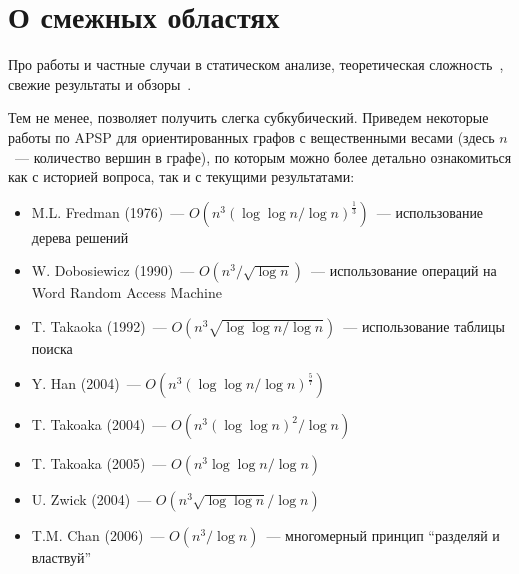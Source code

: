 \section{О смежных областях}
\label{sec:Conclusion_RelatedAreas}

Про работы и частные случаи в статическом анализе, теоретическая сложность~\cite{10.1145/3571252, istomina2023finegrained}, свежие результаты и обзоры~\cite{10.1145/3583660.3583664}.




Тем не менее, позволяет получить слегка субкубический.
 Приведем некоторые работы по APSP для ориентированных графов с вещественными весами (здесь $n$~--- количество вершин в графе), по которым можно более детально ознакомиться как с историей вопроса, так и с текущими результатами:
 \begin{itemize}
     \item M.L. Fredman (1976)~--- $O(n^3(\log \log n / \log n)^\frac{1}{3})$~--- использование дерева решений~
     \item W. Dobosiewicz (1990)~--- $O(n^3 / \sqrt{\log n})$~--- использование операций на Word Random Access Machine~
     \item T. Takaoka (1992)~--- $O(n^3 \sqrt{\log \log n / \log n})$~--- использование таблицы поиска~
     \item Y. Han (2004)~--- $O(n^3 (\log \log n / \log n)^\frac{5}{7})$~
     \item T. Takoaka (2004)~--- $O(n^3 (\log \log n)^2 / \log n)$~
     \item T. Takoaka (2005)~--- $O(n^3 \log \log n / \log n)$~
     \item U. Zwick (2004)~--- $O(n^3 \sqrt{\log \log n} / \log n)$~
     \item T.M. Chan (2006)~--- $O(n^3 / \log n)$~--- многомерный принцип \enquote{разделяй и властвуй}~
 \end{itemize}
